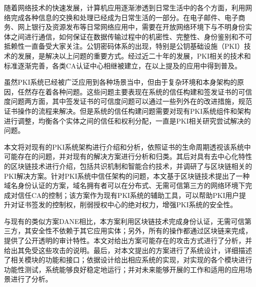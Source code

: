
\begin{cabstract}




随着网络技术的快速发展，计算机应用逐渐渗透到日常生活中的各个方面，利用网络完成各种信息的交换和处理已经成为日常生活的一部分。在电子邮件、电子商务、网上银行及资源发布等日常网络应用中，需要在开放网络环境下与不明身份实体之间进行通信，如何保证在数据传输过程中的机密性、完整性、身份鉴别和不可抵赖性一直备受大家关注。公钥密码体系的出现，特别是公钥基础设施（PKI）技术的发展，是解决以上问题的重要方式。经过近二十年的发展，PKI相关的技术和标准逐渐完善，各类CA认证中心相继被建立，在以上提及的应用中得到普及。


虽然PKI系统已经被广泛应用到各种场景当中，但由于复杂环境和本身架构的原因，任然存在着各种问题。这些问题主要表现在系统的信任构建和签发证书的可信度问题两方面，其中签发证书的可信度问题可以通过一些列外在的改进措施，规范证书操作的流程来解决。但是系统的信任构建问题需要对现有PKI系统组件和架构进行调整，均衡各个实体之间的信任和权利分配，一直是PKI相关研究尝试解决的问题。


本文将对现有的PKI系统架构进行介绍和分析，依照证书的生命周期透视该系统中可能存在的问题，并对现有的解决方案进行分析和归类。其后对具有去中心化特性的区块链技术进行介绍，包括共识机制和智能合约技术，并调研了与区块链相关的PKI解决方案。针对PKI系统中信任架构的问题，本文基于区块链技术提出了一种域名身份认证的方案，域名拥有者可以在分布式、无需可信第三方的网络环境下完成对信任CA的控制；该方案作为现有PKI系统的辅助工具，可以帮助PKI用户提升对证书签发的控制权，削弱授权中心的绝对权力，增强PKI系统的安全性。

与现有的类似方案DANE相比，本方案利用区块链技术完成身份认证，无需可信第三方，其安全性不依赖于其它应用实体；另外，所有的操作都通过区块链来完成，提供了公开透明的审计特性。本文对给出方案可能存在的攻击方式进行了分析，并给出其免受这些攻击的说明。最后，对本文提出的方案进行了系统设计，详细描述了相关模块的功能和接口；依据设计给出相应系统的实现，对实现的各个模块进行功能性测试，系统能够良好稳定地运行；并对未来能够开展的工作和适用的应用场景进行了分析。


\end{cabstract}
